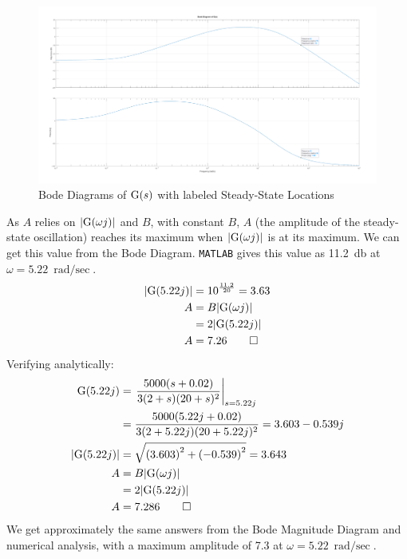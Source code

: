 \begin{hwkProblem}{3}{}
	\begin{figure}[H]
		\begin{center}
			\includegraphics[width=\textwidth]{./images/s03c.png}
		\end{center}
		\caption{Bode Diagrams of \( \func{G}[s] \) with labeled Steady-State Locations}\label{fig:s03c}
	\end{figure}

	\hwkPart{}

	As \( A \) relies on \( |\func{G}[\omega j]| \) and \( B \), with constant \( B \), \( A \) (the amplitude of the steady-state oscillation) reaches its maximum when \( |\func{G}[\omega j]| \) is at its maximum. We can get this value from the Bode Diagram. \lstinline{MATLAB} gives this value as \qty{11.2}{\decibel} at \( \omega = \qty{5.22}{\radian\per\sec} \).
	\begin{align*}
		|\func{G}[5.22 j]| &= 10^{\frac{11.2}{20}} = 3.63 \\
		A &= B |\func{G}[\omega j]| \\
		  &= 2 |\func{G}[5.22 j]| \\
		A &= 7.26 \qed
	\end{align*}
	Verifying analytically:
	\begin{align*}
		\func{G}[5.22j] &= \left. \frac{5000(s+0.02)}{3(2+s)(20+s)^{2}}\right|_{s=5.22j} \\
			      &= \frac{5000(5.22j+0.02)}{3(2+5.22j)(20+5.22j)^{2}} = 3.603 - 0.539j \\
		|\func{G}[5.22j]| &= \sqrt{\left(3.603\right)^{2}+\left(-0.539\right)^{2}} = 3.643 \\
		A &= B |\func{G}[\omega j]| \\
		  &= 2 |\func{G}[5.22 j]| \\
		A &= 7.286 \qed
	\end{align*}
	We get approximately the same answers from the Bode Magnitude Diagram and numerical analysis, with a maximum amplitude of 7.3 at \( \omega = \qty{5.22}{\radian\per\sec} \).


\end{hwkProblem}
